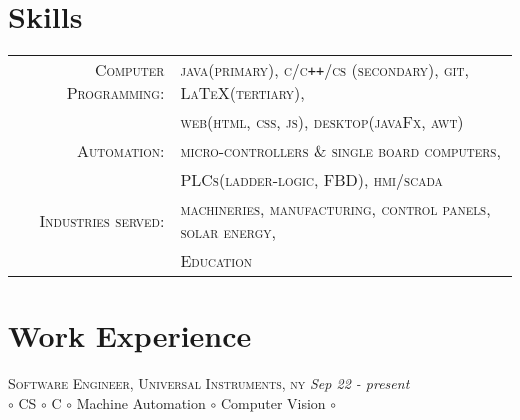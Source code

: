 \documentclass[a4paper]{article}
\begin{document}
\section{		Skills																													}
	\begin{tabular}{rl}	\small{}
	 	\small{}\textsc{		Computer Programming:	}	& \textsc{					java(primary), \small{c/c\texttt{++}/cs (secondary)}, git, \LaTeX (tertiary),	}	\\
  												& \textsc{					web(html, css, js), desktop(javaFx, awt)	} 	\\
 		\small{}\textsc{		Automation:			}	& \textsc{					micro-controllers \& single board computers,						}	\\
  												& \textsc{					PLCs(ladder-logic, FBD), hmi/scada								} 	\\
 		\small{}\textsc{		Industries served:		}	& \textsc{					machineries, manufacturing, control panels, solar energy,				}	\\
  												& \textsc{					Education													} 	\\
	\end{tabular}

\section	{	Work Experience																										}
%
\textsc	{	Software Engineer, Universal Instruments, ny																			} \hfill \emph {Sep 22 - present	}	\\
		{	$\circ$	CS $\circ$ C $\circ$ Machine Automation $\circ$ Computer Vision $\circ$													}	\\
\end{document}
